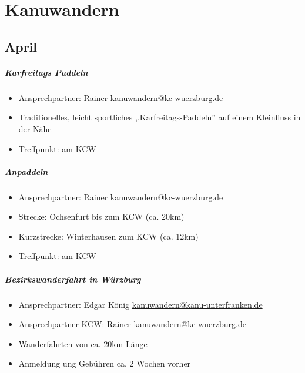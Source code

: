 \documentclass[12pt, a4paper]{report}
\begin{document}
\chapter*{Kanuwandern}
\thispagestyle{Kanuwandern}
\pagestyle{Kanuwandern}
\section*{April}\paragraph{Karfreitags Paddeln}
\begin{itemize}
    \item Ansprechpartner: Rainer \href{mailto:kanuwandern@kc-wuerzburg.de}{kanuwandern@kc-wuerzburg.de}
    \item Traditionelles, leicht sportliches ,,Karfreitags-Paddeln'' auf einem Kleinfluss in der Nähe
    \item Treffpunkt: am KCW
\end{itemize}

\paragraph{Anpaddeln}
\begin{itemize}
    \item Ansprechpartner: Rainer \href{mailto:kanuwandern@kc-wuerzburg.de}{kanuwandern@kc-wuerzburg.de}
    \item Strecke: Ochsenfurt bis zum KCW (ca. 20km)
    \item Kurzstrecke: Winterhausen zum KCW (ca. 12km)
    \item Treffpunkt: am KCW
\end{itemize}

\paragraph{Bezirkswanderfahrt in Würzburg}
\begin{itemize}
    \item Ansprechpartner: Edgar König \href{mailto:kanuwandern@kanu-unterfranken.de}{kanuwandern@kanu-unterfranken.de}
    \item Ansprechpartner KCW: Rainer \href{mailto:kanuwandern@kc-wuerzburg.de}{kanuwandern@kc-wuerzburg.de}
    \item Wanderfahrten von ca. 20km Länge
    \item Anmeldung ung Gebühren ca. 2 Wochen vorher
\end{itemize}
\end{document}
